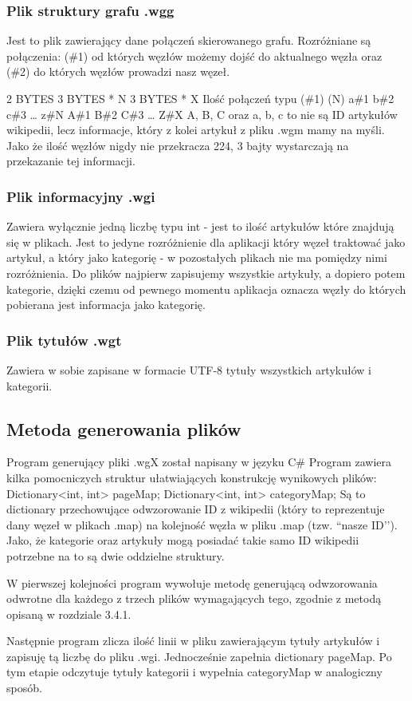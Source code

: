 \subsubsection{Plik struktury grafu .wgg}

Jest to plik zawierający dane połączeń skierowanego grafu. Rozróżniane są połączenia: (\#1) od których węzłów możemy dojść do aktualnego węzła oraz (\#2) do których węzłów prowadzi nasz węzeł.

2 BYTES
3 BYTES * N
3 BYTES * X
Ilość połączeń typu (\#1) (N)
a\#1 b\#2 c\#3 … z\#N
A\#1 B\#2 C\#3 … Z\#X
A, B, C oraz a, b, c to nie są ID artykułów wikipedii, lecz informacje, który z kolei artykuł z pliku .wgm mamy na myśli. Jako że ilość węzłów nigdy nie przekracza 224, 3 bajty wystarczają na przekazanie tej informacji.

\subsubsection{Plik informacyjny .wgi}

Zawiera wyłącznie jedną liczbę typu int - jest to ilość artykułów które znajdują się w plikach. Jest to jedyne rozróżnienie dla aplikacji który węzeł traktować jako artykuł, a który jako kategorię - w pozostałych plikach nie ma pomiędzy nimi rozróżnienia. Do plików najpierw zapisujemy wszystkie artykuły, a dopiero potem kategorie, dzięki czemu od pewnego momentu aplikacja oznacza węzły do których pobierana jest informacja jako kategorię. 

\subsubsection{Plik tytułów .wgt}

Zawiera w sobie zapisane w formacie UTF-8 tytuły wszystkich artykułów i kategorii.

\subsection{Metoda generowania plików}

Program generujący pliki .wgX został napisany w języku C\#
Program zawiera kilka pomocniczych struktur ułatwiających konstrukcję wynikowych plików:
Dictionary<int, int> pageMap;
Dictionary<int, int> categoryMap;
Są to dictionary przechowujące odwzorowanie ID z wikipedii (który to reprezentuje dany węzeł w plikach .map) na kolejność węzła w pliku .map (tzw. ``nasze ID’’). Jako, że kategorie oraz artykuły mogą posiadać takie samo ID wikipedii potrzebne na to są dwie oddzielne struktury.

W pierwszej kolejności program wywołuje metodę generującą odwzorowania odwrotne dla każdego z trzech plików wymagających tego, zgodnie z metodą opisaną w rozdziale 3.4.1.

Następnie program zlicza ilość linii w pliku zawierającym tytuły artykułów i zapisuję tą liczbę do pliku .wgi. Jednocześnie zapełnia dictionary pageMap. Po tym etapie odczytuje tytuły kategorii i wypełnia categoryMap w analogiczny sposób.